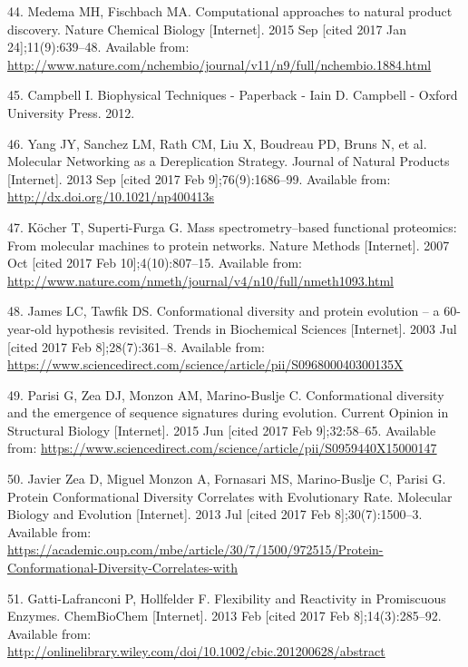 \documentclass[12pt,twoside]{reedthesis}
\begin{document}
  \hypertarget{ref-medema_computational_2015}{}
  44. Medema MH, Fischbach MA. Computational approaches to natural product
  discovery. Nature Chemical Biology {[}Internet{]}. 2015 Sep {[}cited
  2017 Jan 24{]};11(9):639--48. Available from:
  \url{http://www.nature.com/nchembio/journal/v11/n9/full/nchembio.1884.html}
  
  \hypertarget{ref-campbell_biophysical_2012}{}
  45. Campbell I. Biophysical Techniques - Paperback - Iain D. Campbell -
  Oxford University Press. 2012.
  
  \hypertarget{ref-yang_molecular_2013}{}
  46. Yang JY, Sanchez LM, Rath CM, Liu X, Boudreau PD, Bruns N, et al.
  Molecular Networking as a Dereplication Strategy. Journal of Natural
  Products {[}Internet{]}. 2013 Sep {[}cited 2017 Feb 9{]};76(9):1686--99.
  Available from: \url{http://dx.doi.org/10.1021/np400413s}
  
  \hypertarget{ref-kocher_mass_2007}{}
  47. Köcher T, Superti-Furga G. Mass spectrometry--based functional
  proteomics: From molecular machines to protein networks. Nature Methods
  {[}Internet{]}. 2007 Oct {[}cited 2017 Feb 10{]};4(10):807--15.
  Available from:
  \url{http://www.nature.com/nmeth/journal/v4/n10/full/nmeth1093.html}
  
  \hypertarget{ref-james_conformational_2003}{}
  48. James LC, Tawfik DS. Conformational diversity and protein evolution
  -- a 60-year-old hypothesis revisited. Trends in Biochemical Sciences
  {[}Internet{]}. 2003 Jul {[}cited 2017 Feb 8{]};28(7):361--8. Available
  from:
  \url{https://www.sciencedirect.com/science/article/pii/S096800040300135X}
  
  \hypertarget{ref-parisi_conformational_2015}{}
  49. Parisi G, Zea DJ, Monzon AM, Marino-Buslje C. Conformational
  diversity and the emergence of sequence signatures during evolution.
  Current Opinion in Structural Biology {[}Internet{]}. 2015 Jun {[}cited
  2017 Feb 9{]};32:58--65. Available from:
  \url{https://www.sciencedirect.com/science/article/pii/S0959440X15000147}
  
  \hypertarget{ref-javier_zea_protein_2013}{}
  50. Javier Zea D, Miguel Monzon A, Fornasari MS, Marino-Buslje C, Parisi
  G. Protein Conformational Diversity Correlates with Evolutionary Rate.
  Molecular Biology and Evolution {[}Internet{]}. 2013 Jul {[}cited 2017
  Feb 8{]};30(7):1500--3. Available from:
  \url{https://academic.oup.com/mbe/article/30/7/1500/972515/Protein-Conformational-Diversity-Correlates-with}
  
  \hypertarget{ref-gatti-lafranconi_flexibility_2013}{}
  51. Gatti-Lafranconi P, Hollfelder F. Flexibility and Reactivity in
  Promiscuous Enzymes. ChemBioChem {[}Internet{]}. 2013 Feb {[}cited 2017
  Feb 8{]};14(3):285--92. Available from:
  \url{http://onlinelibrary.wiley.com/doi/10.1002/cbic.201200628/abstract}
  
\end{document}
